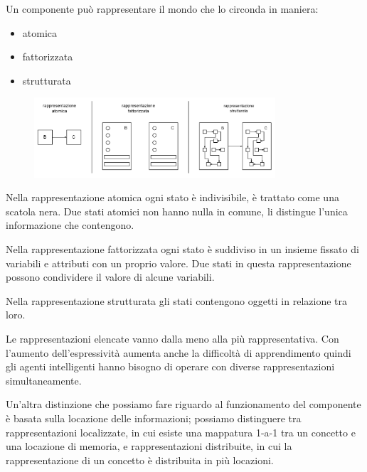 Un componente può rappresentare il mondo che lo circonda in maniera:

\begin{itemize}
	\item atomica
	\item fattorizzata
	\item strutturata
\end{itemize}

\begin{figure}[H]
	\centering
	\includegraphics[width=0.8\textwidth]{capitoli/agenti-intelligenti/imgs/componenti.png}
\end{figure}

Nella rappresentazione atomica ogni stato è indivisibile, è trattato come una scatola nera. Due stati atomici non hanno nulla in comune, li distingue l'unica informazione che contengono.

Nella rappresentazione fattorizzata ogni stato è suddiviso in un insieme fissato di variabili e attributi con un proprio valore. Due stati in questa rappresentazione possono condividere il valore di alcune variabili.

Nella rappresentazione strutturata gli stati contengono oggetti in relazione tra loro.

Le rappresentazioni elencate vanno dalla meno alla più rappresentativa. 
Con l'aumento dell'espressività aumenta anche la difficoltà di apprendimento 
quindi gli agenti intelligenti hanno bisogno di operare con diverse 
rappresentazioni simultaneamente.

Un'altra distinzione che possiamo fare riguardo al funzionamento del componente è basata sulla locazione delle informazioni; possiamo distinguere tra rappresentazioni localizzate, in cui esiste una mappatura 1-a-1 tra un concetto e una locazione di memoria, e rappresentazioni distribuite, in cui la rappresentazione di un concetto è distribuita in più locazioni.